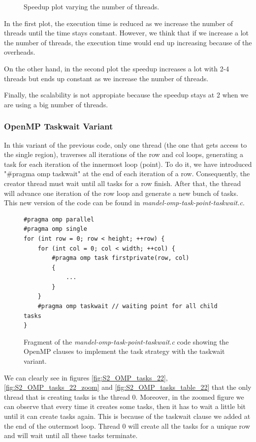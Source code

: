 \documentclass[12pt, a4paper]{article}
\begin{document}
\begin{figure}[H]
\begin{minipage}[b]{0.4\linewidth}
  \caption{Speedup plot varying the number of threads.}
  \label{fig:mandel-omp-10000-strong-21-speedup}
\end{minipage}
\end{figure}

In the first plot, the execution time is reduced as we increase the number of threads until the time stays constant. However, we think that if we increase a lot the number of threads, the execution time would end up increasing because of the overheads.

On the other hand, in the second plot the speedup increases a lot with 2-4 threads but ends up constant as we increase the number of threads.

Finally, the scalability is not appropiate because the speedup stays at 2 when we are using a big number of threads.

\subsubsection{OpenMP Taskwait Variant}

In this variant of the previous code, only one thread (the one that gets access to the single region), traverses all iterations of the row and col loops, generating a task for each iteration of the innermost loop (point). To do it, we have introduced "\#pragma omp taskwait" at the end of each iteration of a row. Consequently, the creator thread must wait until all tasks for a row finish. After that, the thread will advance one iteration of the row loop and generate a new bunch of tasks. This new version of the code can be found in \textit{mandel-omp-task-point-taskwait.c}.

\begin{figure}[H]
\begin{lstlisting}
#pragma omp parallel
#pragma omp single
for (int row = 0; row < height; ++row) {
	for (int col = 0; col < width; ++col) {
		#pragma omp task firstprivate(row, col)
		{
			...
		}
	}
	#pragma omp taskwait // waiting point for all child tasks
}
\end{lstlisting}
\caption{Fragment of the \textit{mandel-omp-task-point-taskwait.c} code showing the OpenMP clauses to implement the task strategy with the taskwait variant.}
\label{code:task_implementation_point_taskwait}
\end{figure}

We can clearly see in figures \ref{fig:S2_OMP_tasks_22}, \ref{fig:S2_OMP_tasks_22_zoom} and \ref{fig:S2_OMP_tasks_table_22} that the only thread that is creating tasks is the thread 0. Moreover, in the zoomed figure we can observe that every time it creates some tasks, then it has to wait a little bit until it can create tasks again. This is because of the taskwait clause we added at the end of the outermost loop. Thread 0 will create all the tasks for a unique row and will wait until all these tasks terminate.
\end{document}
